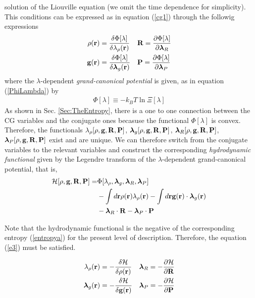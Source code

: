 \documentclass[b5paper,openright,10pt]{book}
\begin{document}
  solution of  the Liouville equation (we omit the time  dependence for simplicity). This conditions can be expressed as in equation (\ref{cg1}) through the followig expressions 
\begin{align}
  \rho({\bf r}) &=\frac{\delta \Phi [\lambda]}{\delta \lambda_\rho({\bf r}) }
&&{\bf R} =\frac{\partial \Phi [\lambda]}{\partial \boldsymbol{\lambda}_R }
\nonumber\\
  {\bf g}({\bf r}) &=\frac{\delta \Phi [\lambda]}{\delta \boldsymbol{\lambda}_g({\bf r}) }
&&{\bf P} =\frac{\partial \Phi [\lambda]}{\partial \boldsymbol{\lambda}_P }
\label{rgo}
\end{align}
where the $\lambda$-dependent {\em grand-canonical potential} is given, as in equation (\ref{PhiLambda}) by
\begin{eqnarray}
  \Phi [\lambda]\equiv-k_BT \ln\Xi [\lambda]
\label{oh}
\end{eqnarray}
As shown in Sec. \ref{Sec:TheEntropy}, there is a one to one connection between the CG variables and the conjugate ones becasuse the functional $\Phi[\lambda]$ is convex.  
Therefore, the  functionals $\lambda_{\rho}[\rho,{\bf  g},{\bf R},{\bf
  P}]$,   $\boldsymbol{\lambda}_g[\rho,{\bf   g},{\bf  R},{\bf   P}]$,
$\boldsymbol{\lambda}_R[\rho,{\bf      g},{\bf      R},{\bf      P}]$,
$\boldsymbol{\lambda}_P[\rho,{\bf g},{\bf  R},{\bf P}]$ exist  and are
unique.   We  can  therefore   switch  from  the  conjugate  variables
 to  the   relevant   variables  and  construct   the
 corresponding {\em hydrodynamic functional} given   by   the   Legendre    transform   of   the $\lambda$-dependent grand-canonical potential, that is,
\begin{align}
    {\cal H}[\rho,{\bf g},{\bf R},{\bf P}] =&
\Phi [\lambda_\rho,\boldsymbol{\lambda}_g,\boldsymbol{\lambda}_R,\boldsymbol{\lambda}_P]
\nonumber\\
    & -
\int d{\bf r}\rho({\bf r})\lambda_\rho({\bf r})
-
\int d{\bf r}{\bf g}({\bf r})\cdot\boldsymbol{\lambda}_g({\bf r})
\nonumber\\
    &    -\boldsymbol{\lambda}_R\cdot{\bf R}-\boldsymbol{\lambda}_P\cdot{\bf P}
\label{oleg}
\end{align}

Note that the hydrodynamic functional  is the negative of the corresponding entropy (\ref{entropya}) for the present level of description. Therefore, the equation (\ref{e3}) must be satisfied.

\begin{align}
  \lambda_\rho({\bf r}) &=-\frac{\delta {\cal H}}{\delta \rho({\bf r}) }
&&  \boldsymbol{\lambda}_R =-\frac{\partial {\cal H}}{\partial {\bf R} }
\nonumber\\
  \boldsymbol{\lambda}_g({\bf r}) &=-\frac{\delta {\cal H}}{\delta {\bf g}({\bf r}) }
&&  \boldsymbol{\lambda}_P =-\frac{\partial {\cal H}}{\partial{\bf P} }
\label{lno}
\end{align}
\end{document}
